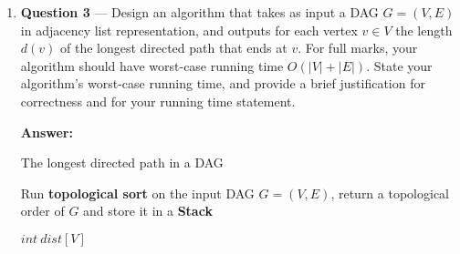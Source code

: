 \documentclass[11pt]{article}
\theoremstyle{definition}
\begin{document}
\begin{enumerate}
\begin{enumerate}
\end{enumerate}

\newpage

\item[] \textbf{Question 3} --- Design an algorithm that takes as input a DAG $G = (V, E)$ in adjacency list representation, and outputs for each vertex $v \in V$ the length $d(v)$ of the longest directed path that ends at $v$. For full marks, your algorithm should have worst-case running time $O(|V | + |E|)$. State your algorithm’s worst-case running time, and provide a brief justification for correctness and for your running time statement.

\textbf{Answer:}

\begin{algorithm}[H]
\caption{The longest directed path in a DAG}%
\LinesNumbered %
Run \textbf{topological sort} on the input DAG $G=(V,E)$, return a topological order of $G$ and store it in a \textbf{Stack}\; %

$int\ dist[V]$\;



\end{algorithm}


\end{enumerate}
\end{document}
